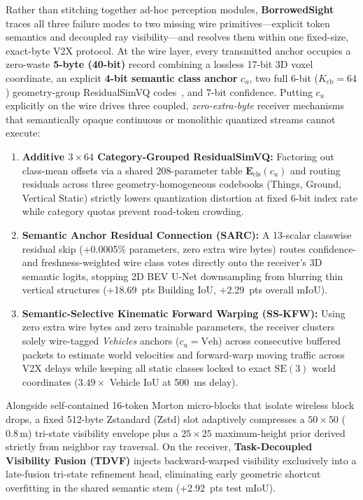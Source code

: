 \documentclass[journal]{IEEEtran}
\begin{document}
Rather than stitching together ad-hoc perception modules, \textbf{BorrowedSight} traces all three failure modes to two missing wire primitives---explicit token semantics and decoupled ray visibility---and resolves them within one fixed-size, exact-byte V2X protocol. At the wire layer, every transmitted anchor occupies a zero-waste \textbf{5-byte (40-bit)} record combining a lossless 17-bit 3D voxel coordinate, an explicit \textbf{4-bit semantic class anchor} $c_u$, two full 6-bit ($K_{\mathrm{cb}} = 64$) geometry-group ResidualSimVQ codes~\cite{zhu2025simvq,fifty2025rotation}, and 7-bit confidence. Putting $c_u$ explicitly on the wire drives three coupled, \textit{zero-extra-byte} receiver mechanisms that semantically opaque continuous or monolithic quantized streams cannot execute:
\begin{enumerate}
\item \textbf{Additive $3\times 64$ Category-Grouped ResidualSimVQ:} Factoring out class-mean offsets via a shared 208-parameter table $\mathbf{E}_{\mathrm{cls}}(c_u)$ and routing residuals across three geometry-homogeneous codebooks (Things, Ground, Vertical Static) strictly lowers quantization distortion at fixed 6-bit index rate while category quotas prevent road-token crowding.
\item \textbf{Semantic Anchor Residual Connection (SARC):} A 13-scalar classwise residual skip (+0.0005\% parameters, zero extra wire bytes) routes confidence- and freshness-weighted wire class votes directly onto the receiver's 3D semantic logits, stopping 2D BEV U-Net downsampling from blurring thin vertical structures (+18.69~pts Building IoU, +2.29~pts overall mIoU).
\item \textbf{Semantic-Selective Kinematic Forward Warping (SS-KFW):} Using zero extra wire bytes and zero trainable parameters, the receiver clusters solely wire-tagged \textit{Vehicles} anchors ($c_u = \mathrm{Veh}$) across consecutive buffered packets to estimate world velocities and forward-warp moving traffic across V2X delays while keeping all static classes locked to exact $\mathrm{SE}(3)$ world coordinates ($3.49\times$ Vehicle IoU at 500~ms delay).
\end{enumerate}
Alongside self-contained 16-token Morton micro-blocks that isolate wireless block drops, a fixed 512-byte Zstandard (Zstd) slot adaptively compresses a $50\times 50$ ($0.8\,\mathrm{m}$) tri-state visibility envelope plus a $25\times 25$ maximum-height prior derived strictly from neighbor ray traversal. On the receiver, \textbf{Task-Decoupled Visibility Fusion (TDVF)} injects backward-warped visibility exclusively into a late-fusion tri-state refinement head, eliminating early geometric shortcut overfitting in the shared semantic stem (+2.92~pts test mIoU).
\end{document}
